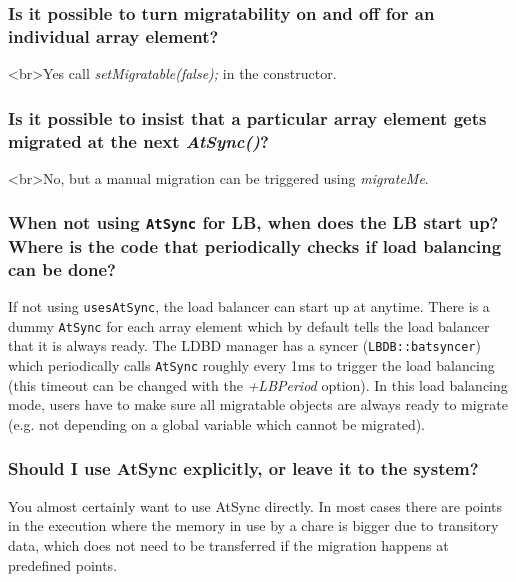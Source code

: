\subsubsection{Is it possible to turn migratability on and off for an individual array
element?}

<br>Yes call {\em  setMigratable(false);} in the constructor.

\subsubsection{Is it possible to insist that a particular array element gets migrated
at the next {\em AtSync()}?}

<br>No, but a manual migration can be triggered using {\em migrateMe}.


\subsubsection{When not using {\tt AtSync} for LB, when does the LB start
up? Where is the code that periodically checks if load balancing can be
done?}

If not using {\tt usesAtSync}, the load balancer can start up at
anytime. There is a dummy {\tt AtSync} for each array element which
by default tells the load balancer that it is always ready. The LDBD manager
has a syncer ({\tt LBDB::batsyncer}) which periodically calls {\tt AtSync}
roughly every 1ms to trigger the load balancing (this timeout can be changed
with the {\em +LBPeriod} option). In this load balancing
mode, users have to make sure all migratable objects are always ready to
migrate (e.g. not depending on a global variable which cannot be migrated).

\subsubsection{Should I use AtSync explicitly, or leave it to the system?}

You almost certainly want to use AtSync directly. In most cases there are
points in the execution where the memory in use by a chare is bigger due to
transitory data, which does not need to be transferred if the migration happens
at predefined points.


